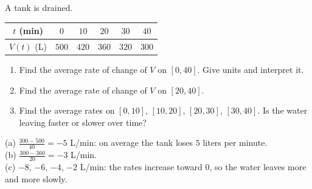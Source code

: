 \begin{exo}{}
A tank is drained. \;\begin{tabular}{|c|c|c|c|c|c|}\hline$t$ (min)&$0$&$10$&$20$&$30$&$40$\\\hline$V(t)$ (L)&$500$&$420$&$360$&$320$&$300$\\\hline\end{tabular}
\begin{enumerate}[label=(\alph*)]
\item Find the average rate of change of $V$ on $[0,40]$. Give units and interpret it.
\item Find the average rate of change of $V$ on $[20,40]$.
\item Find the average rates on $[0,10]$, $[10,20]$, $[20,30]$, $[30,40]$. Is the water leaving faster or slower over time?
\end{enumerate}
\work{4.5cm}
\begin{solution}
(a) $\frac{300-500}{40}=-5$ L/min: on average the tank loses $5$ liters per minute.\\
(b) $\frac{300-360}{20}=-3$ L/min.\\
(c) $-8$, $-6$, $-4$, $-2$ L/min: the rates increase toward $0$, so the water leaves more and more slowly.
\end{solution}
\end{exo}

